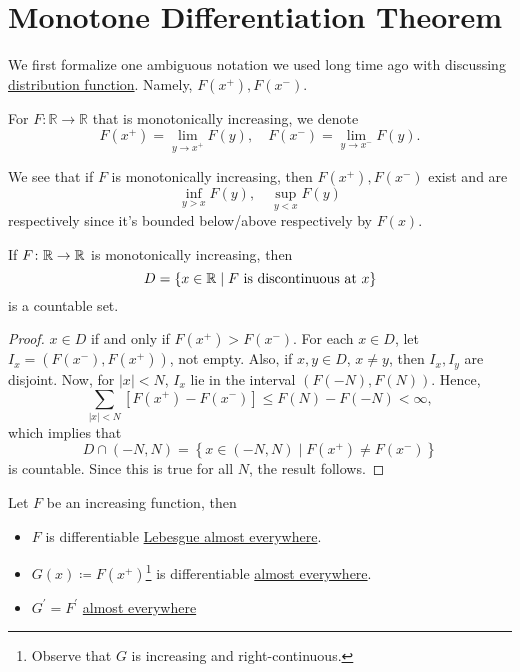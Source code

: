\section{Monotone Differentiation Theorem}
We first formalize one ambiguous notation we used long time ago with discussing \hyperref[def:distribution-function]{distribution function}.
Namely, \(F(x^+), F(x^-)\).
\begin{definition}[\(F(x^+), F(x^-)\)]\label{def:x-plus}\label{def:x-minus}
	For \(F \colon  \mathbb{R} \to \mathbb{R}\) that is monotonically increasing, we denote
	\[
		F(x^+) = \lim_{y \to x^+} F(y), \quad F(x^-) = \lim_{y \to x^-} F(y).
	\]
\end{definition}
\begin{remark}
	We see that if \(F\) is monotonically increasing, then \(F(x^+), F(x^-)\) exist and are
	\[
		\inf_{y > x} F(y),\quad \sup_{y < x} F(y)
	\]
	respectively since it's bounded below/above respectively by \(F(x)\).
\end{remark}
\begin{lemma}\label{lma:lec-33}
	If \(F\colon \mathbb{\MakeUppercase{r}} \to \mathbb{\MakeUppercase{r}} \) is monotonically increasing, then
	\[
		D = \{x\in \mathbb{\MakeUppercase{r}}  \mid F \text{ is discontinuous at } x\}
	\]
	is a countable set.
\end{lemma}
\begin{proof}
	\(x \in D\) if and only if \(F(x^+) > F(x^-)\). For each \(x \in D\), let \(I_x = (F(x^-),F(x^+))\), not empty.
	Also, if \(x,y \in D\), \(x \neq y\), then \(I_x,I_y\) are disjoint. Now, for \(\left\vert x \right\vert < N\), \(I_x\) lie in the interval
	\((F(-N), F(N))\). Hence,
	\[
		\sum\limits_{\left\vert x \right\vert < N}\left[F(x^+) - F(x^-)\right] \leq F(N) - F(-N) <\infty,
	\]
	which implies that
	\[
		D \cap (-N, N) = \left\{x\in (-N, N) \mid F(x^+) \neq F(x^-)\right\}
	\]
	is countable. Since this is true for all \(N\), the result follows.
\end{proof}

\begin{theorem}\label{thm:monotone-differentiation}
	Let \(F\) be an increasing function, then
	\begin{itemize}
		\item \(F\) is differentiable \hyperref[def:mu-almost-everywhere]{Lebesgue almost everywhere}.
		\item \(G(x) \coloneqq F(x^+)\)\footnote{Observe that \(G\) is increasing and right-continuous.} is differentiable \hyperref[def:mu-almost-everywhere]{almost everywhere}.
		\item \(G^\prime  = F^\prime \) \hyperref[def:mu-almost-everywhere]{almost everywhere}
	\end{itemize}
\end{theorem}

